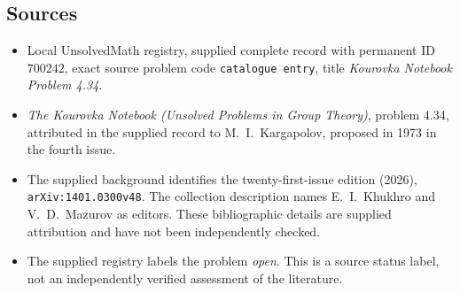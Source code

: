 \documentclass[11pt]{article}
\begin{document}
\subsection{Sources}
\begin{itemize}
\item Local UnsolvedMath registry, supplied complete record with permanent ID \(700242\), exact source problem code \texttt{catalogue entry}, title \emph{Kourovka Notebook Problem 4.34}.
\item \emph{The Kourovka Notebook (Unsolved Problems in Group Theory)}, problem 4.34, attributed in the supplied record to M.\ I.\ Kargapolov, proposed in 1973 in the fourth issue.
\item The supplied background identifies the twenty-first-issue edition (2026), \texttt{arXiv:1401.0300v48}. The collection description names E.\ I.\ Khukhro and V.\ D.\ Mazurov as editors. These bibliographic details are supplied attribution and have not been independently checked.
\item The supplied registry labels the problem \emph{open}. This is a source status label, not an independently verified assessment of the literature.
\end{itemize}
\end{document}

